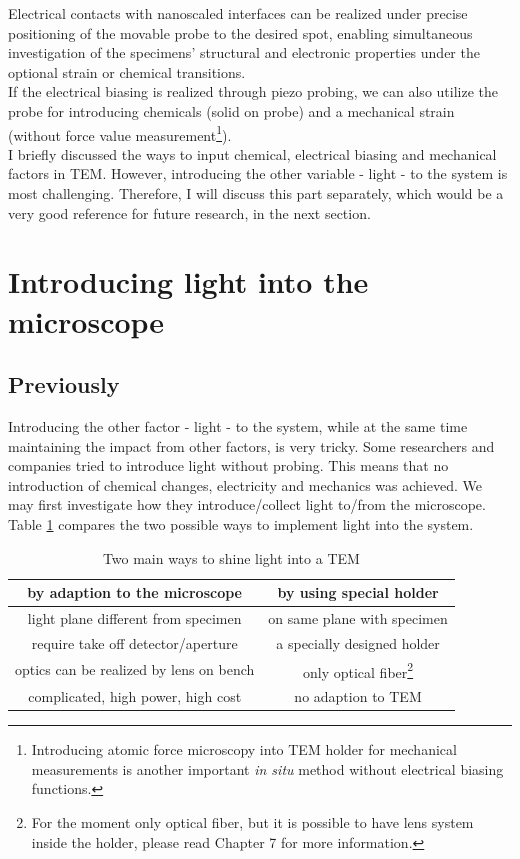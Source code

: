 Electrical contacts with nanoscaled interfaces can be realized under precise positioning of the movable probe to the desired spot, enabling simultaneous investigation of the specimens' structural and electronic properties under the optional strain or chemical transitions.\\

If the electrical biasing is realized through piezo probing, we can also utilize the probe for introducing chemicals (solid on probe) and a mechanical strain (without force value measurement\footnote{Introducing atomic force microscopy into TEM holder for mechanical measurements is another important {\em in situ} method without electrical biasing functions.}). \\

I briefly discussed the ways to input chemical, electrical biasing and mechanical factors in TEM. However, introducing  the other variable - light - to the system is most challenging. Therefore, I will discuss this part separately, which would be a very good reference for future research, in the next section. 

\section{Introducing light into the microscope}
\subsection{Previously}
Introducing the other factor - light - to the system, while at the same time maintaining the impact from other factors, is very tricky. Some researchers and companies tried to introduce light without probing. This means that no introduction of chemical changes, electricity and mechanics was achieved. We may first investigate how they introduce/collect light to/from the microscope. 
Table \ref{table2.1} compares the two possible ways to implement light into the system. 

\begin{table}[ht]
\centering 
\begin{tabular}{|c|c|} 
\hline 
by adaption to the microscope & by using special holder \\ [0.5ex] 
\hline 
light plane different from specimen & on same plane with specimen \\[1.5ex] 
require take off detector/aperture & a specially designed holder \\[1.5ex]
optics can be realized by lens on bench & only optical fiber\footnote{For the moment only optical fiber, but it is possible to have lens system inside the holder, please read Chapter 7 for more information.} \\[1.5ex]
complicated, high power, high cost & no adaption to TEM\\[1.5ex]
\hline
\end{tabular}
\caption{Two main ways to shine light into a TEM} 
\label{table2.1} 
\end{table}

